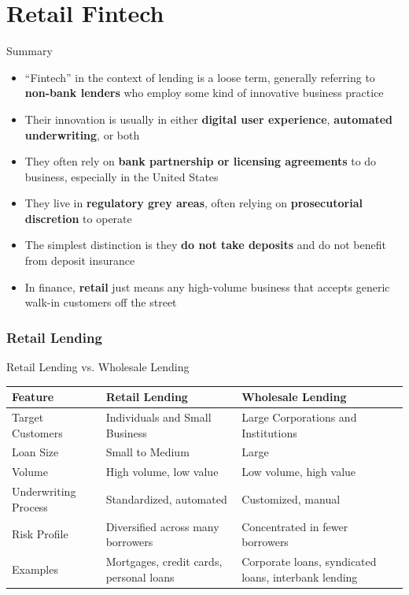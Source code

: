 \documentclass[aspectratio=169]{beamer}
\begin{document}
\section{Retail Fintech}

\begin{frame}{Summary}

\begin{itemize}
    \item ``Fintech'' in the context of lending is a loose term, generally referring to \textbf{non-bank lenders} who employ some kind of innovative business practice 
    \item Their innovation is usually in either \textbf{digital user experience}, \textbf{automated underwriting}, or both 
    \item They often rely on \textbf{bank partnership or licensing agreements} to do business, especially in the United States
    \item They live in \textbf{regulatory grey areas}, often relying on \textbf{prosecutorial discretion} to operate
    \item The simplest distinction is they \textbf{do not take deposits} and do not benefit from deposit insurance
    \item In finance, \textbf{retail} just means any high-volume business that accepts generic walk-in customers off the street 
\end{itemize}
    
\end{frame}



\begin{frame}
\frametitle{Retail Lending}


Retail Lending vs. Wholesale Lending \\

\begin{table}[H]
\centering
\begin{tabular}{@{}p{3.5cm}p{4.5cm}p{4.5cm}@{}}
\toprule
\textbf{Feature} & \textbf{Retail Lending} & \textbf{Wholesale Lending} \\ 
\midrule
Target Customers & Individuals and Small Business & Large Corporations and Institutions\\
\hline 
Loan Size & Small to Medium & Large \\
\hline 
Volume & High volume, low value & Low volume, high value \\
\hline 
Underwriting Process & Standardized, automated & Customized, manual \\
\hline 
Risk Profile & Diversified across many borrowers & Concentrated in fewer borrowers \\
\hline 
Examples & Mortgages, credit cards, personal loans & Corporate loans, syndicated loans, interbank lending \\ 
\bottomrule
\end{tabular}
\end{table}


	
\end{frame} 
\end{document}
